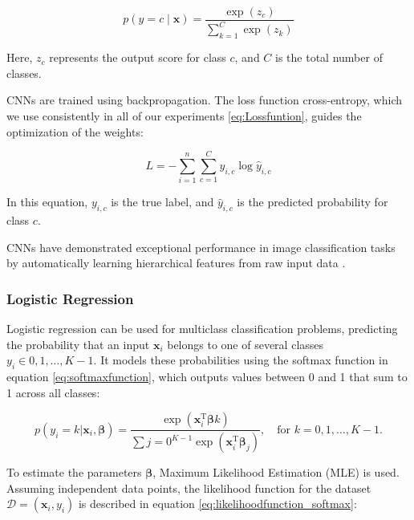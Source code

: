 \begin{equation}
    p(y = c \mid \boldsymbol{x}) = \frac{\exp(z_c)}{\sum_{k=1}^C \exp(z_k)}
    \label{eq:softmaxfunction}
\end{equation}

Here, \(z_c\) represents the output score for class \(c\), and \(C\) is the total number of classes.

CNNs are trained using backpropagation. The loss function cross-entropy, which we use consistently in all of our experiments \ref{eq:Lossfuntion}, guides the optimization of the weights:

\begin{equation}
    L = -\sum_{i=1}^n \sum_{c=1}^C y_{i,c} \log \hat{y}_{i,c}
    \label{eq:Lossfuntion}
\end{equation}

In this equation, \(y_{i,c}\) is the true label, and \(\hat{y}_{i,c}\) is the predicted probability for class \(c\).

CNNs have demonstrated exceptional performance in image classification tasks by automatically learning hierarchical features from raw input data \cite{raschka2022machine}.

\subsubsection{Logistic Regression}

Logistic regression can be used for multiclass classification problems, predicting the probability that an input $\boldsymbol{x}_i$ belongs to one of several classes $y_i \in {0, 1, \dots, K-1}$. It models these probabilities using the softmax function in equation \ref{eq:softmaxfunction}, which outputs values between 0 and 1 that sum to 1 across all classes:

\begin{equation}
p(y_i = k \vert \boldsymbol{x}_i, \boldsymbol{\beta}) = \frac{\exp(\boldsymbol{x}_i^\mathrm{T} \boldsymbol{\beta}k)}{\sum{j=0}^{K-1} \exp(\boldsymbol{x}_i^\mathrm{T} \boldsymbol{\beta}_j)}, \quad \text{for } k = 0, 1, \dots, K-1.
\label{eq:softmaxfunction}
\end{equation}

To estimate the parameters $\boldsymbol{\beta}$, Maximum Likelihood Estimation (MLE) is used. Assuming independent data points, the likelihood function for the dataset $\mathcal{D} = { (\boldsymbol{x}_i, y_i) }$ is described in equation \ref{eq:likelihoodfunction_softmax}:

